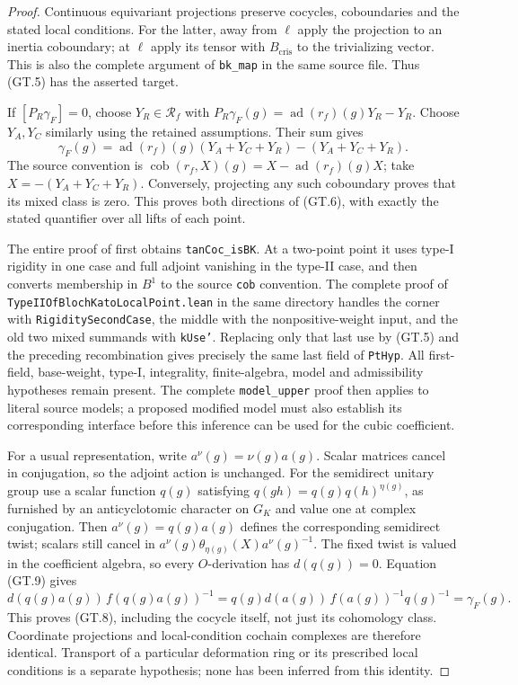 \begin{proof}
Continuous equivariant projections preserve cocycles,
coboundaries and the stated local conditions.  For the latter,
away from $\ell$ apply the projection to an inertia coboundary;
at $\ell$ apply its tensor with $B_{\mathrm{cris}}$ to the
trivializing vector.  This is also the complete argument of
\texttt{bk\_map} in the same source file.  Thus (GT.5) has the
asserted target.

If $[P_R\gamma_F]=0$, choose $Y_R\in\mathcal R_f$ with
$P_R\gamma_F(g)=\operatorname{ad}(r_f)(g)Y_R-Y_R$.
Choose $Y_A,Y_C$ similarly using the retained assumptions.
Their sum gives
\[
 \gamma_F(g)=\operatorname{ad}(r_f)(g)(Y_A+Y_C+Y_R)
                                      -(Y_A+Y_C+Y_R).
\]
The source convention is
$\operatorname{cob}(r_f,X)(g)=X-\operatorname{ad}(r_f)(g)X$;
take $X=-(Y_A+Y_C+Y_R)$.
Conversely, projecting any such coboundary proves that its mixed
class is zero.  This proves both directions of (GT.6), with
exactly the stated quantifier over all lifts of each point.

The entire proof of
first obtains \texttt{tanCoc\_isBK}.  At a two-point point it
uses type-I rigidity in one case and full adjoint vanishing in
the type-II case, and then converts membership in $B^1$ to the
source \texttt{cob} convention.
The complete proof of \texttt{TypeIIOfBlochKatoLocalPoint.lean}
in the same directory handles the corner with
\texttt{RigiditySecondCase}, the middle with the nonpositive-weight
input, and the old two mixed summands with \texttt{kUse'}.
Replacing only that last use by (GT.5) and the preceding
recombination gives precisely the same last field of
\texttt{PtHyp}.  All first-field, base-weight, type-I,
integrality, finite-algebra, model and admissibility hypotheses
remain present.  The complete \texttt{model\_upper} proof then
applies to literal source models; a proposed modified model must
also establish its corresponding interface before this inference
can be used for the cubic coefficient.

For a usual representation, write $a^\nu(g)=\nu(g)a(g)$.
Scalar matrices cancel in conjugation, so the adjoint action is
unchanged.  For the semidirect unitary group use a scalar function
$q(g)$ satisfying $q(gh)=q(g)q(h)^{\eta(g)}$, as furnished by
an anticyclotomic character on $G_K$ and value one at complex
conjugation.  Then $a^\nu(g)=q(g)a(g)$ defines the corresponding
semidirect twist; scalars still cancel in
$a^\nu(g)\theta_{\eta(g)}(X)a^\nu(g)^{-1}$.
The fixed twist is valued in the coefficient algebra, so every
$O$-derivation has $d(q(g))=0$.  Equation (GT.9) gives
\[
 d(q(g)a(g))\,f(q(g)a(g))^{-1}
   =q(g)d(a(g))\,f(a(g))^{-1}q(g)^{-1}
   =\gamma_F(g).
\]
This proves (GT.8), including the cocycle itself, not just its
cohomology class.  Coordinate projections and local-condition
cochain complexes are therefore identical.  Transport of a
particular deformation ring or its prescribed local conditions
is a separate hypothesis; none has been inferred from this
identity.
\end{proof}


